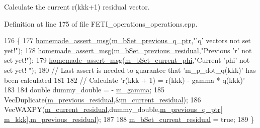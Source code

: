 Calculate the current {\ttfamily r(kkk+1)} residual vector. 



Definition at line 175 of file F\+E\+T\+I\+\_\+operations\+\_\+operations.\+cpp.


\begin{DoxyCode}
176 \{
177     \hyperlink{common__header_8h_a593ccc80b790b2268653fcf6597bf451}{homemade\_assert\_msg}(\hyperlink{classcarl_1_1_f_e_t_i___operations_a9bacd2df5ed75055635acc7336c96bef}{m\_bSet\_previous\_q\_ptr},\textcolor{stringliteral}{"'q' vectors not set
       yet!"});
178     \hyperlink{common__header_8h_a593ccc80b790b2268653fcf6597bf451}{homemade\_assert\_msg}(\hyperlink{classcarl_1_1_f_e_t_i___operations_a2368fc7147e38fa780d89e0b2c676d5d}{m\_bSet\_previous\_residual},\textcolor{stringliteral}{"Previous 'r'
       not set yet!"});
179     \hyperlink{common__header_8h_a593ccc80b790b2268653fcf6597bf451}{homemade\_assert\_msg}(\hyperlink{classcarl_1_1_f_e_t_i___operations_af9131d1125ae99d73932d11ee5c4c7b7}{m\_bSet\_current\_phi},\textcolor{stringliteral}{"Current 'phi' not set yet!
      "});
180     \textcolor{comment}{// Last assert is needed to guarantee that 'm\_p\_dot\_q(kkk)' has been calculated}
181 
182     \textcolor{comment}{// Calculate 'r(kkk + 1) = r(kkk) - gamma * q(kkk)'}
183 
184     \textcolor{keywordtype}{double} dummy\_double = - \hyperlink{classcarl_1_1_f_e_t_i___operations_a619c40aa27c7aa1e82feed9e8780991f}{m\_gamma};
185     VecDuplicate(\hyperlink{classcarl_1_1_f_e_t_i___operations_a3097f0040b5f00a717883840c95ca7e6}{m\_previous\_residual},&\hyperlink{classcarl_1_1_f_e_t_i___operations_a6b1154885f5b8303ecbd32ea76df40e5}{m\_current\_residual});
186     VecWAXPY(\hyperlink{classcarl_1_1_f_e_t_i___operations_a6b1154885f5b8303ecbd32ea76df40e5}{m\_current\_residual},dummy\_double,\hyperlink{classcarl_1_1_f_e_t_i___operations_a7ff19f8422276b403c971d31611945c5}{m\_previous\_q\_ptr}[
      \hyperlink{classcarl_1_1_f_e_t_i___operations_aae9d8e6d2d0436cda061359f1602b096}{m\_kkk}],\hyperlink{classcarl_1_1_f_e_t_i___operations_a3097f0040b5f00a717883840c95ca7e6}{m\_previous\_residual});
187 
188     \hyperlink{classcarl_1_1_f_e_t_i___operations_a1f1f890054d63bdf25937e6bf66fa5ce}{m\_bSet\_current\_residual} = \textcolor{keyword}{true};
189 \}
\end{DoxyCode}
\hypertarget{classcarl_1_1_f_e_t_i___operations_abb5c3844bf76169f8ded17fb797fac63}{}
